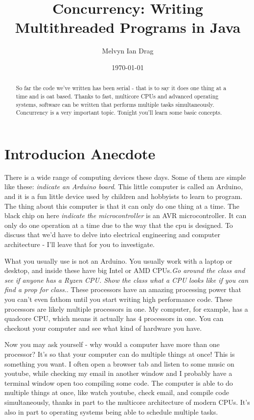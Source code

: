 \documentclass[12pt]{article}
\title{Concurrency: Writing Multithreaded Programs in Java}
\author{
	Melvyn Ian Drag
}
\date{\today}
\begin{document}
\maketitle

\begin{abstract}
So far the code we've written has been serial - that is to say it does one thing at a time and is oat based. Thanks to fast, multicore CPUs and advanced operating systems, software can be written that performs multiple tasks simultaneously. Concurrency is a very important topic. Tonight you'll learn some basic concepts.
\end{abstract}

\section{Introducion Anecdote}
There is a wide range of computing devices these days. Some of them are simple like these: \textit{indicate an Arduino board}. This little computer is called an Arduino, and it is a fun little device used by children and hobbyists to learn to program. The thing about this computer is that it can only do one thing at a time. The black chip on here \textit{indicate the microcontroller} is an AVR microcontroller. It can only do one operation at a time due to the way that the cpu is designed. To discuss that we'd have to delve into electrical engineering and computer architecture - I'll leave that for you to investigate.

What you usually use is not an Arduino. You usually work with a laptop or desktop, and inside these have big Intel or AMD CPUs.\textit{Go around the class and see if anyone has a Ryzen CPU. Show the class what a CPU looks like if you can find a prop for class.}. These processors have an amazing processing power that you can't even fathom until you start writing high performance code. These processors are likely multiple processors in one. My computer, for example, has a quadcore CPU, which means it actually has 4 processors in one. You can checkout your computer and see what kind of hardware you have.

Now you may ask yourself - why would a computer have more than one processor? It's so that your computer can do multiple things at once! This is something you want. I often open a browser tab and listen to some music on youtube, while checking my email in another window and I probably have a terminal window open too compiling some code. The computer is able to do multiple things at once, like watch youtube, check email, and compile code simultaneously, thanks in part to the multicore architecture of modern CPUs. It's also in part to operating systems being able to schedule multiple tasks. 
\end{document}
